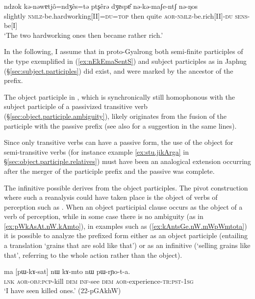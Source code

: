 \begin{exe}
\ex \label{ex:nEkEmaSentS} 
\gll  ndzok kǝ-nǝwɐtjô=ndʒês=tǝ ptʂêrǝ dʒɐspɐ̂ nǝ-kǝ-maʃe-ntʃ nǝ-ŋos \\
slightly \textsc{nmlz}-be.hardworking[II]=\textsc{du}=\textsc{top} then quite \textsc{aor}-\textsc{nmlz}-be.rich[II]-\textsc{du} \textsc{sens}-be[I] \\
\glt `The two hardworking ones then became rather rich.' \citep[193--194]{lin09phd}
\end{exe}

In the following, I assume that in proto-Gyalrong both semi-finite participles of the type exemplified in (\ref{ex:nEkEmaSentS}) and subject participles as in Japhug (§\ref{sec:subject.participles}) did exist, and were marked by the ancestor of the  prefix.

The object participle in , which is synchronically still homophonous with the subject participle of a passivized transitive verb (§\ref{sec:object.participle.ambiguity}), likely originates from the fusion of the  participle with the passive  prefix (see also \citealt{jackson06guanxiju, jacksonlin07} for a suggestion in the same lines).

Since only transitive verbs can have a passive form, the use of the object for semi-transitive verbs (for instance example \ref{ex:stu.jikArga} in §\ref{sec:object.participle.relatives}) must have been an analogical extension occurring after the merger of the participle prefix and the passive was complete. 

The  infinitive possible derives from the object participles. The pivot construction where such a reanalysis could have taken place is the object of verbs of perception such as . When an object participial clause occurs as the object of a verb of perception, while in some case there is no ambiguity (as in \ref{ex:pWkAsAt.nW.kAmto}), in examples such as (\ref{ex:kAntsGe.nW.mWpWmtota}) it is possible to analyze the  prefixed form either as an object participle (entailing a translation `grains that are sold like that') or as an infinitive (`selling grains like that', referring to the whole action rather than the object).

\begin{exe}
\ex \label{ex:pWkAsAt.nW.kAmto} 
\gll ma [pɯ-kɤ-sat] nɯ kɤ-mto nɯ pɯ-rɲo-t-a. \\
\textsc{lnk} \textsc{aor}-\textsc{obj}:\textsc{pcp}-kill \textsc{dem} \textsc{inf}-see \textsc{dem} \textsc{aor}-experience-\textsc{tr}:\textsc{pst}-\textsc{1sg} \\
\glt `I have seen killed ones.' (22-pGAkhW)
\end{exe}

